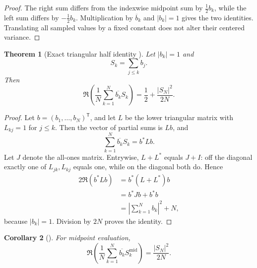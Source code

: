 \documentclass[11pt]{amsart}
\numberwithin{equation}{section}
\theoremstyle{plain}
\newtheorem{theorem}{Theorem}[section]
\newtheorem{corollary}[theorem]{Corollary}
\theoremstyle{definition}
\theoremstyle{remark}
\newcommand{\1}{\mathbf{1}}
\begin{document}
\begin{proof}
The right sum differs from the indexwise midpoint sum by
\(\frac12b_k\), while the left sum differs by \(-\frac12b_k\).
Multiplication by \(\overline b_k\) and \(|b_k|=1\) gives the two
identities.  Translating all sampled values by a fixed constant does not
alter their centered variance.
\end{proof}


\begin{theorem}[Exact triangular half identity {}]
\label{thm:triangular_half}
Let \(|b_k|=1\) and
\begin{equation}
S_k=\sum_{j\leq k}b_j.
\label{eq:triangular_partial_sums}
\end{equation}
Then
\begin{equation}
\boxed{
\Re\left(
\frac1N\sum_{k=1}^N\overline{b_k}S_k
\right)
=
\frac12+\frac{|S_N|^2}{2N}.
}
\label{eq:triangular_half_identity}
\end{equation}
\end{theorem}

\begin{proof}
Let \(b=(b_1,\ldots,b_N)^{\mathsf T}\), and let \(L\) be the lower
triangular matrix with \(L_{kj}=1\) for \(j\leq k\).  Then the vector of
partial sums is \(Lb\), and
\begin{equation}
\sum_{k=1}^{N}\overline{b_k}S_k
=
b^\ast Lb.
\label{eq:triangular_form_detailed}
\end{equation}
Let \(J\) denote the all-ones matrix.  Entrywise, \(L+L^\ast\) equals
\(J+I\): off the diagonal exactly one of \(L_{jk},L_{kj}\) equals one,
while on the diagonal both do.  Hence
\begin{align}
2\Re(b^\ast Lb)
&=
b^\ast(L+L^\ast)b
\label{eq:triangular_real_part_one}
\\
&=
b^\ast Jb+b^\ast b
\label{eq:triangular_real_part_two}
\\
&=
\left|\sum_{k=1}^{N}b_k\right|^2+N,
\label{eq:triangular_real_part_three}
\end{align}
because \(|b_k|=1\).  Division by \(2N\) proves the identity.
\end{proof}


\begin{corollary}[{}]
\label{cor:midpoint_triangular}
For midpoint evaluation,
\begin{equation}
\Re\left(
\frac1N\sum_{k=1}^N
\overline{b_k}S_k^{\mathrm{mid}}
\right)
=
\frac{|S_N|^2}{2N}.
\label{eq:midpoint_triangular}
\end{equation}
\end{corollary}
\end{document}
